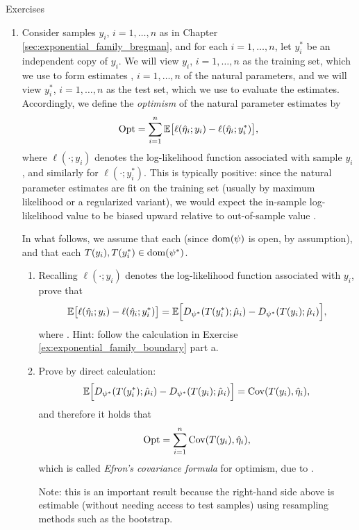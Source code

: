 \begin{xcb}{Exercises}
\begin{enumerate}[label=\thechapter.\arabic*]
\item \label{ex:exponential_family_optimism}
  Consider samples $y_i$, $i=1,\dots,n$ as in Chapter
  \ref{sec:exponential_family_bregman}, and for each $i=1,\dots,n$, let $y^*_i$
  be an independent copy of $y_i$. We will view $y_i$, $i=1,\dots,n$ as the
  training set, which we use to form estimates ,
  $i=1,\dots,n$ of the natural parameters, and we will view $y_i^*$,
  $i=1,\dots,n$ as the test set, which we use to evaluate the estimates.   
  Accordingly, we define the \emph{optimism} of the natural parameter estimates
  by  
  \[
  \mathrm{Opt} = \sum_{i=1}^n \mathbb{E}\big[ \ell(\hat\eta_i; y_i) -
  \ell(\hat\eta_i; y_i^*) \big],
  \]
  where $\ell(\cdot; y_i)$ denotes the log-likelihood function associated
  with sample $y_i$, and similarly for $\ell(\cdot; y_i^*)$. This is typically
  positive: since the natural parameter estimates are fit on the training set 
  (usually by maximum likelihood or a regularized variant), we would expect the 
  in-sample log-likelihood value  to be biased 
  upward relative to out-of-sample value . 
  
  In what follows, we assume that each  (since $\operatorname{dom}(\psi)$ is open, by assumption), and
  that each $T(y_i), T(y_i^*) \in \operatorname{dom}(\psi^*)$. 

\begin{enumerate}[label=\alph*.]
\item Recalling $\ell(\cdot; y_i)$ denotes the log-likelihood function
  associated with $y_i$, prove that 
  \[
  \mathbb{E}\big[ \ell(\hat\eta_i; y_i) - \ell(\hat\eta_i; y_i^*) \big] = 
  \mathbb{E}\Big[ D_{\psi^*}(T(y_i^*); \hat\mu_i) - D_{\psi^*}(T(y_i); \hat\mu_i)
  \Big], 
  \]
  where . Hint: follow the
  calculation in Exercise \ref{ex:exponential_family_boundary} part a. 

\item Prove by direct calculation:
  \[ 
  \mathbb{E}\Big[ D_{\psi^*}(T(y_i^*); \hat\mu_i) - D_{\psi^*}(T(y_i); \hat\mu_i)
  \Big] = \operatorname{Cov}(T(y_i), \hat\eta_i),
  \]
  and therefore it holds that
  \[
  \mathrm{Opt} = \sum_{i=1}^n \operatorname{Cov}(T(y_i), \hat\eta_i),
  \]
  which is called \emph{Efron's covariance formula} for optimism, due to 
  \cite{efron1986biased}.  

  \smallskip
  Note: this is an important result because the right-hand side above is
  estimable (without needing access to test samples) using resampling methods
  such as the bootstrap.  
\end{enumerate}



\end{enumerate}
\end{xcb}
